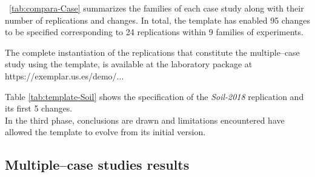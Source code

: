 \tablename~\ref{tab:compara-Case} summarizes the families of each case study along with their number of replications and changes. 
In total, the template has enabled 95 changes to be specified corresponding to 24 replications within 9 families of experiments. 
     
The complete instantiation of the replications that constitute the multiple--case study using the template, is available at the laboratory package at https://exemplar.us.es/demo/...

Table \ref{tab:template-Soil}  shows the specification of the \emph{Soil-2018} replication and its first 5 changes. \\



In the third phase, conclusions are drawn and limitations encountered have allowed the template to evolve from its initial version.

\subsection{Multiple--case studies results}
\label{sec:CS-Results} 


